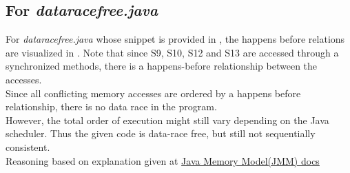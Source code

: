 \documentclass{article}
\begin{document}
    \subsection{For \textit{dataracefree.java}}
      For \textit{dataracefree.java} whose snippet is provided in , the happens before relations are visualized in . Note that since S9, S10, S12 and S13 are accessed through a synchronized methods, there is a happens-before relationship between the accesses. \\
      Since all conflicting memory accesses are ordered by a happens before relationship, there is no data race in the program. \\
      However, the total order of execution might still vary depending on the Java scheduler. Thus the given code is data-race free, but still not sequentially consistent.\\
      Reasoning based on explanation given at \href{https://docs.oracle.com/javase/specs/jls/se7/html/jls-17.html#jls-17.4.5}{Java Memory Model(JMM) docs}
\end{document}
